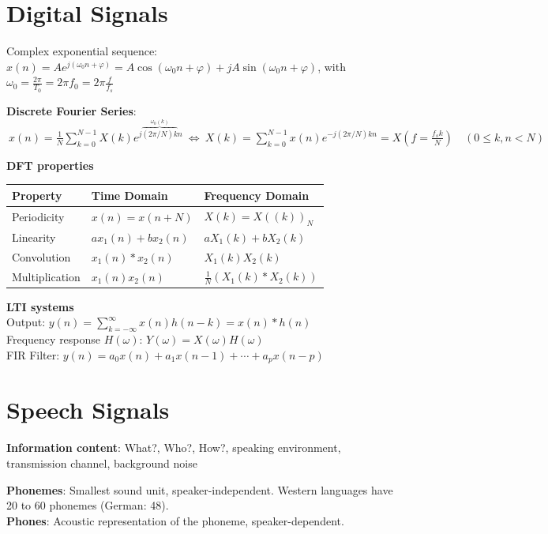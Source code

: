 
\section{Digital Signals}
Complex exponential sequence: \(x(n) = Ae^{j(\omega_0n+\varphi)} = A \cos(\omega_0n+\varphi) + jA\sin(\omega_0n+\varphi)\),
with \(\omega_0=\frac{2\pi}{T_0}=2\pi f_0 = 2 \pi \frac{f}{f_s}\)

\textbf{Discrete Fourier Series}: \(\displaystyle \ x(n)=\frac{1}{N}\sum_{k=0}^{N-1}X(k)e^{j\overbrace{(2\pi/N)k}^{\omega_0(k)}n}
\ \Leftrightarrow \ X(k)=\sum_{k=0}^{N-1}x(n)e^{-j(2\pi/N)kn} = \textstyle X(f{=}\frac{f_s k}{N})
\quad( 0 \le k,n < N)\)

\begin{minipage}[t]{0.49\textwidth}
    \textbf{DFT properties}\\
    \begin{tabular}{@{}lll@{}}\toprule
        Property & Time Domain & Frequency Domain \\ \midrule
        Periodicity & \(x(n) = x(n+N)\) & \(X(k) = X((k))_N\) \\
        Linearity & \(ax_1(n) + bx_2(n)\) & \(aX_1(k) + bX_2(k)\) \\
        Convolution & \(x_1(n) * x_2(n)\) & \(X_1(k) X_2(k)\) \\
        Multiplication & \(x_1(n) x_2(n)\) & \(\frac{1}{N}(X_1(k) * X_2(k))\) \\
        \bottomrule
    \end{tabular}
\end{minipage}
\hfill
\begin{minipage}[t]{0.49\textwidth}
    \textbf{LTI systems}\\
    Output: \(y(n) = \sum_{k=-\infty}^{\infty}x(n)h(n-k) = x(n) * h(n)\)\\
    Frequency response \(H(\omega)\): \(Y(\omega)=X(\omega)H(\omega)\)\\
    FIR Filter: \(y(n)=a_0x(n) + a_1x(n-1) + \cdots + a_px(n-p)\)
\end{minipage}


\section{Speech Signals}
\textbf{Information content}: What?, Who?, How?, speaking environment, transmission channel, background noise

\textbf{Phonemes}: Smallest sound unit, speaker-independent. Western languages have 20 to 60 phonemes (German: 48).\\
\textbf{Phones}: Acoustic representation of the phoneme, speaker-dependent.


